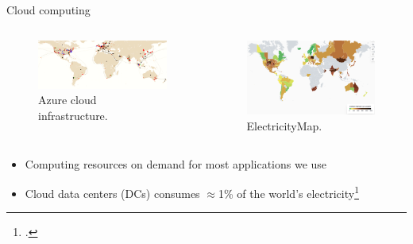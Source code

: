 \documentclass[Ligatures=TeX,table,svgnames,usetotalslideindicator,compress,10pt,aspectratio=169]{beamer}
\begin{document}
\begin{frame}{Cloud computing}

\begin{columns}        
\begin{column}{0.5\textwidth}
    \begin{figure}[!h]
    \centering
    \includegraphics[width=\textwidth]{images/azure_datacenters.png}
    \caption{Azure cloud infrastructure.}
    \end{figure}
\end{column}        
\begin{column}{0.5\textwidth}
    \begin{figure}[!h]
    \centering
    \includegraphics[width=\textwidth]{images/electricity_map.png}
    \caption{ElectricityMap.}
    \end{figure}
    \end{column} 
\end{columns}

  \begin{itemize}
  \item Computing resources on demand for most applications we use
  \item Cloud data centers (DCs) consumes $\approx$1\% of the world's electricity\footcite{IEA_2022} 
  \end{itemize}
\end{frame}
\end{document}

